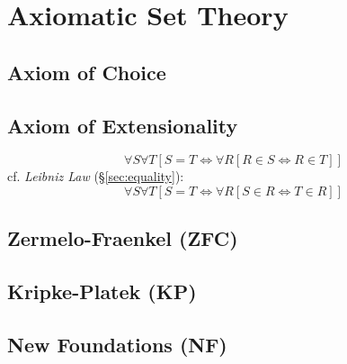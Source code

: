 \section{Axiomatic Set Theory}\label{sec:axiomatic_set_theory}

\subsection{Axiom of Choice}\label{sec:choice_axiom}

\subsection{Axiom of Extensionality}\label{sec:extensionality_axiom}
\[
  \forall S \forall T
    [S = T \Leftrightarrow \forall R [ R \in S \Leftrightarrow R \in T ]]
\]
cf. \emph{Leibniz Law} (\S\ref{sec:equality}):
\[
  \forall S \forall T
    [S = T \Leftrightarrow \forall R [ S \in R \Leftrightarrow T \in R ]]
\]

\subsection{Zermelo-Fraenkel (ZFC)}\label{sec:zermelo_fraenkel}


\subsection{Kripke-Platek (KP)}\label{sec:kripke_platek}

\subsection{New Foundations (NF)}\label{sec:quine_foundations}



